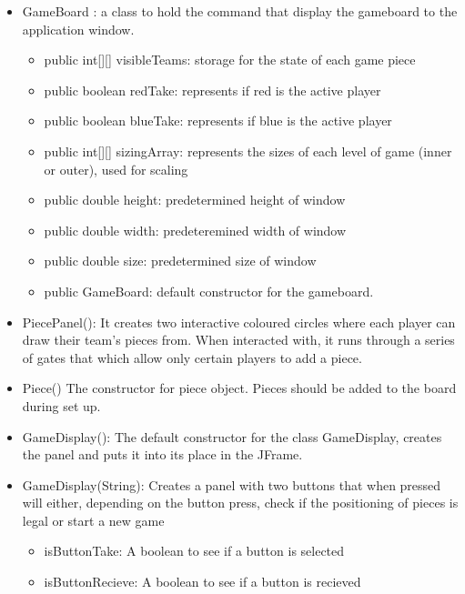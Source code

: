 \documentclass[12pt]{article}
\begin{document}
\begin{itemize}
		\item GameBoard : a class to hold the command that display the gameboard to the application window. 
			\begin{itemize}
			\item public int[][] visibleTeams: storage for the state of each game piece
			\item public boolean redTake: represents if red is the active player
			\item public boolean blueTake: represents if blue is the active player
			\item public int[][] sizingArray: represents the sizes of each level of game (inner or outer), used for scaling
			\item public double height: predetermined height of window
			\item public double width: predeteremined width of window
			\item public double size: predetermined size of window
			\item public GameBoard: default constructor for the gameboard.
			\end{itemize}
	\item PiecePanel(): It creates two interactive coloured circles where each player can draw their team's pieces from. When interacted with, it runs through a series of gates that which allow only certain players to add a piece.
	\item Piece() The constructor for piece object. Pieces should be added to the board during set up.
				\item GameDisplay(): The default constructor for the class GameDisplay, creates the panel and puts it into its place in the JFrame.
				\item GameDisplay(String): Creates a panel with two buttons that when pressed will either, depending on the button press, check if the positioning of pieces is legal or start a new game
				\begin{itemize}
					\item isButtonTake: A boolean to see if a button is selected
					\item isButtonRecieve: A boolean to see if a button is recieved
					
				\end{itemize}
	\end{itemize}
\end{document}
